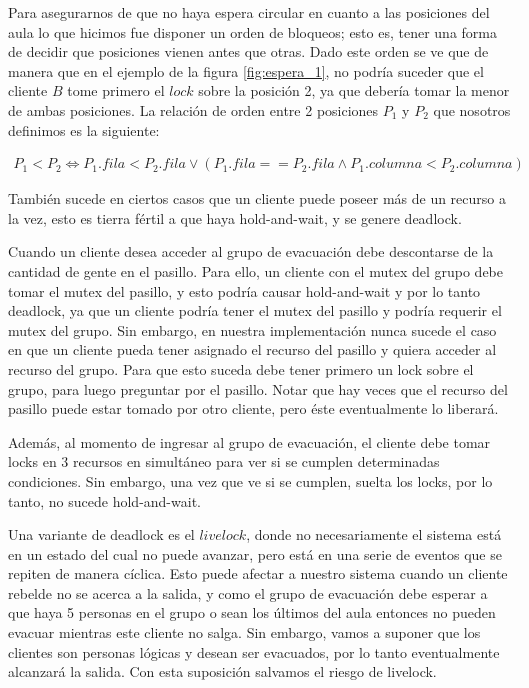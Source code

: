 Para asegurarnos de que no haya espera circular en cuanto a las posiciones del aula lo que hicimos fue disponer un orden de bloqueos; esto es, tener una forma de decidir que posiciones vienen antes que otras. Dado este orden se ve que de manera que en el ejemplo de la figura \ref{fig:espera_1}, no podría suceder que el cliente $B$ tome primero el $lock$ sobre la posición 2, ya que debería tomar la menor de ambas posiciones. La relación de orden entre 2 posiciones $P_{1}$ y $P_{2}$ que nosotros definimos es la siguiente:

\begin{align*}
	P_{1} < P_{2} \iff P_{1}.fila < P_{2}.fila \lor (P_{1}.fila == P_{2}.fila \land P_{1}.columna < P_{2}.columna)
\end{align*}

También sucede en ciertos casos que un cliente puede poseer más de un recurso a la vez, esto es tierra fértil a que haya hold-and-wait, y se genere deadlock.

Cuando un cliente desea acceder al grupo de evacuación debe descontarse de la cantidad de gente en el pasillo. Para ello, un cliente con el mutex del grupo debe tomar el mutex del pasillo, y esto podría causar hold-and-wait y por lo tanto deadlock, ya que un cliente podría tener el mutex del pasillo y podría requerir el mutex del grupo. Sin embargo, en nuestra implementación nunca sucede el caso en que un cliente pueda tener asignado el recurso del pasillo y quiera acceder al recurso del grupo. Para que esto suceda debe tener primero un lock sobre el grupo, para luego preguntar por el pasillo. Notar que hay veces que el recurso del pasillo puede estar tomado por otro cliente, pero éste eventualmente lo liberará.

Además, al momento de ingresar al grupo de evacuación, el cliente debe tomar locks en 3 recursos en simultáneo para ver si se cumplen determinadas condiciones. Sin embargo, una vez que ve si se cumplen, suelta los locks, por lo tanto, no sucede hold-and-wait.

Una variante de deadlock es el $livelock$, donde no necesariamente el sistema está en un estado del cual no puede avanzar, pero está en una serie de eventos que se repiten de manera cíclica. Esto puede afectar a nuestro sistema cuando un cliente rebelde no se acerca a la salida, y como el grupo de evacuación debe esperar a que haya 5 personas en el grupo o sean los últimos del aula entonces no pueden evacuar mientras este cliente no salga. Sin embargo, vamos a suponer que los clientes son personas lógicas y desean ser evacuados, por lo tanto eventualmente alcanzará la salida. Con esta suposición salvamos el riesgo de livelock.